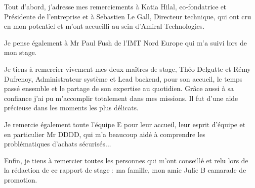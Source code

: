 Tout d'abord, j'adresse mes remerciements à Katia Hilal, co-fondatrice et Présidente de l'entreprise et à Sebastien Le Gall, Directeur technique, qui ont cru en mon potentiel et m’ont accueilli au sein d'Amiral Technologies.

Je pense également à Mr Paul Fush de l'IMT Nord Europe qui m'a suivi lors de mon stage.

Je tiens à remercier vivement mes deux maîtres de stage, Théo Delgutte et Rémy Dufrenoy, Administrateur système et Lead backend, pour son accueil, le temps passé ensemble et le partage de son expertise au quotidien.
Grâce aussi à sa confiance j'ai pu m'accomplir totalement dans mes missions.
Il fut d'une aide précieuse dans les moments les plus délicats.

Je remercie également toute l'équipe E pour leur accueil, leur esprit d'équipe et en particulier Mr DDDD, qui m'a beaucoup aidé à comprendre les problématiques d'achats sécurisés...

Enfin, je tiens à remercier toutes les personnes qui m'ont conseillé et relu lors de la rédaction de ce rapport de stage : ma famille, mon amie Julie B camarade de promotion.